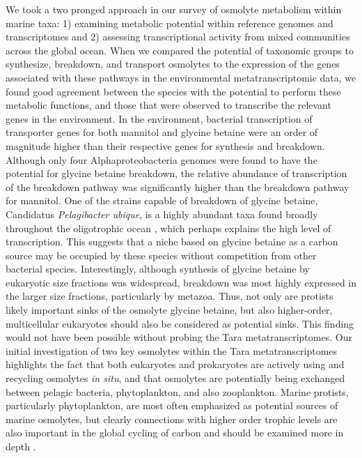 \documentclass[utf8]{frontiersSCNS} %
\begin{document}
We took a two pronged approach in our survey of osmolyte metabolism within marine taxa: 1) examining metabolic potential within reference genomes and transcriptomes and 2) assessing transcriptional activity from mixed communities across the global ocean. When we compared the potential of taxonomic groups to synthesize, breakdown, and transport osmolytes to the expression of the genes associated with these pathways in the environmental metatranscriptomic data, we found good agreement between the species with the potential to perform these metabolic functions, and those that were observed to transcribe the relevant genes in the environment. In the environment, bacterial transcription of transporter genes for both mannitol and glycine betaine were an order of magnitude higher than their respective genes for synthesis and breakdown. Although only four Alphaproteobacteria genomes were found to have the potential for glycine betaine breakdown, the relative abundance of transcription of the breakdown pathway was significantly higher than the breakdown pathway for mannitol. One of the strains capable of breakdown of glycine betaine, Candidatus \emph{Pelagibacter ubique}, is a highly abundant taxa found broadly throughout the oligotrophic ocean \citep{Morris2002}, which perhaps explains the high level of transcription. This suggests that a niche based on glycine betaine as a carbon source may be occupied by these species without competition from other bacterial species. Interestingly, although synthesis of glycine betaine by eukaryotic size fractions was widespread, breakdown was most highly expressed in the larger size fractions, particularly by metazoa. Thus, not only are protists likely important sinks of the osmolyte glycine betaine, but also higher-order, multicellular eukaryotes should also be considered as potential sinks. This finding  would not have been possible without probing the Tara metatranscriptomes. Our initial investigation of two key osmolytes within the Tara metatranscriptomes highlights the fact that both eukaryotes and prokaryotes are actively using and recycling osmolytes \emph{in situ}, and that osmolytes are potentially being exchanged between pelagic bacteria, phytoplankton, and also zooplankton. Marine protists, particularly phytoplankton, are most often emphasized as potential sources of marine osmolytes, but clearly connections with higher order trophic levels are also important in the global cycling of carbon and should be examined more in depth \citep{Durham2019,Clifford2020}.
\end{document}
